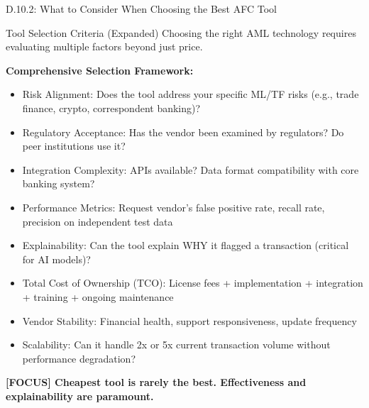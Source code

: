 \documentclass[11pt,a4paper]{beamer}
\newcommand{\examfocus}[1]{\textcolor{orange!80!black}{\textbf{[FOCUS] #1}}}
\begin{document}
\begin{frame}{D.10.2: What to Consider When Choosing the Best AFC Tool}
	\begin{block}{Tool Selection Criteria (Expanded)}
		Choosing the right AML technology requires evaluating multiple factors beyond just price.
	\end{block}
	\textbf{Comprehensive Selection Framework:}
	\begin{itemize}
		\item Risk Alignment: Does the tool address your specific ML/TF risks (e.g., trade finance, crypto, correspondent banking)?
		\item Regulatory Acceptance: Has the vendor been examined by regulators? Do peer institutions use it?
		\item Integration Complexity: APIs available? Data format compatibility with core banking system?
		\item Performance Metrics: Request vendor's false positive rate, recall rate, precision on independent test data
		\item Explainability: Can the tool explain WHY it flagged a transaction (critical for AI models)?
		\item Total Cost of Ownership (TCO): License fees + implementation + integration + training + ongoing maintenance
		\item Vendor Stability: Financial health, support responsiveness, update frequency
		\item Scalability: Can it handle 2x or 5x current transaction volume without performance degradation?
	\end{itemize}
	\examfocus{Cheapest tool is rarely the best. Effectiveness and explainability are paramount.}
\end{frame}
\end{document}
